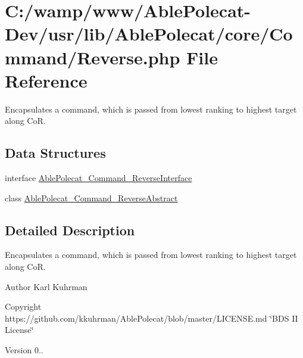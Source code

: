 \hypertarget{_reverse_8php}{}\section{C\+:/wamp/www/\+Able\+Polecat-\/\+Dev/usr/lib/\+Able\+Polecat/core/\+Command/\+Reverse.php File Reference}
\label{_reverse_8php}


Encapsulates a command, which is passed from lowest ranking to highest target along Co\+R.  


\subsection*{Data Structures}
\begin{DoxyCompactItemize}
\item 
interface \hyperlink{interface_able_polecat___command___reverse_interface}{Able\+Polecat\+\_\+\+Command\+\_\+\+Reverse\+Interface}
\item 
class \hyperlink{class_able_polecat___command___reverse_abstract}{Able\+Polecat\+\_\+\+Command\+\_\+\+Reverse\+Abstract}
\end{DoxyCompactItemize}


\subsection{Detailed Description}
Encapsulates a command, which is passed from lowest ranking to highest target along Co\+R. 

\begin{DoxyAuthor}{Author}
Karl Kuhrman 
\end{DoxyAuthor}
\begin{DoxyCopyright}{Copyright}
https\+://github.com/kkuhrman/\+Able\+Polecat/blob/master/\+L\+I\+C\+E\+N\+S\+E.\+md \char`\"{}\+B\+D\+S I\+I License\char`\"{} 
\end{DoxyCopyright}
\begin{DoxyVersion}{Version}
0.. 
\end{DoxyVersion}
